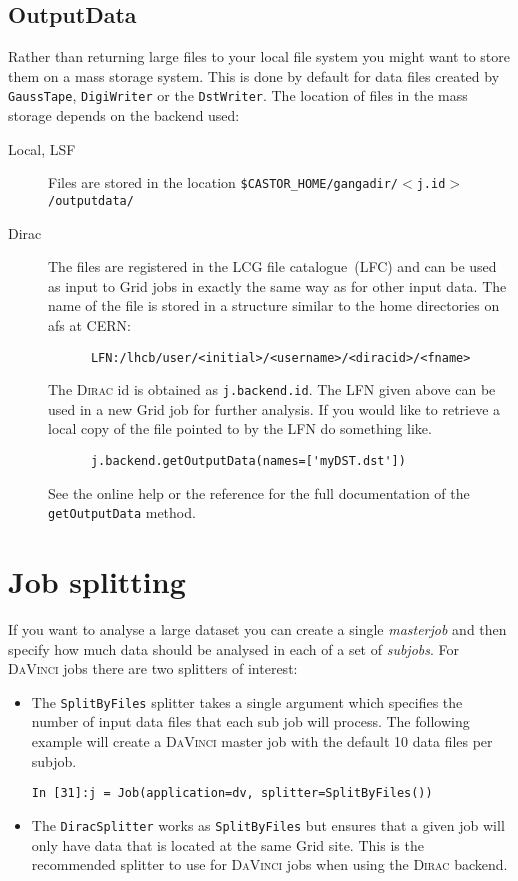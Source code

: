 \documentclass{howto}
\def\davinci {\textsc{DaVinci}\xspace}
\def\dirac {\textsc{Dirac}\xspace}
\begin{document}
\subsection{OutputData}
\label{sec:OutputData}
Rather than returning large files to your local file system you might want to
store them on a mass storage system. This is done by default for data files
created by \texttt{GaussTape}, \texttt{DigiWriter} or the
\texttt{DstWriter}. The location of files in the mass storage depends on the
backend used:
\begin{description}
\item[Local, LSF] Files are stored in the location
  \texttt{\$CASTOR_HOME/gangadir/$<$j.id$>$/outputdata/}
\item[Dirac] The files are registered in the LCG file catalogue~(LFC) and can
  be used as input to Grid jobs in exactly the same way as for other input
  data. The name of the file is stored in a structure similar to the home
  directories on afs at CERN:
\begin{verbatim}
      LFN:/lhcb/user/<initial>/<username>/<diracid>/<fname> 
\end{verbatim}
  The \dirac id is obtained as \texttt{j.backend.id}. The LFN given above can
  be used in a new Grid job for further analysis. If you would like to
  retrieve a local copy of the file pointed to by the LFN do something like.
\begin{verbatim}
      j.backend.getOutputData(names=['myDST.dst'])
\end{verbatim}
  See the online help or the reference for the full documentation of the
  \texttt{getOutputData} method.
\end{description}

\section{Job splitting}
\label{sec:splitting}
If you want to analyse a large dataset you can create a single
\emph{masterjob} and then specify how much data should be analysed in each of
a set of \emph{subjobs}. For \davinci jobs there are two splitters of interest:
\begin{itemize}
\item The \texttt{SplitByFiles} splitter takes a single argument which
  specifies the number of input data files that each sub job will process. The
  following example will create a \davinci master job with the default 10 data
  files per subjob.
\begin{verbatim}
In [31]:j = Job(application=dv, splitter=SplitByFiles())
\end{verbatim}
\item The \texttt{DiracSplitter} works as \texttt{SplitByFiles} but ensures
  that a given job will only have data that is located at the same Grid
  site. This is the recommended splitter to use for \davinci jobs when using
  the \dirac backend.
\end{itemize}
\end{document}

